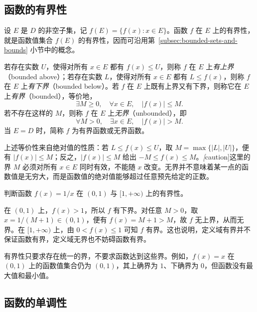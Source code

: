 \documentclass[UTF8,12pt,a4paper,fontset=fandol]{ctexbook}
\begin{document}
\subsection{函数的有界性}
\label{subsec:boundedness-of-functions}

设 $E$ 是 $D$ 的非空子集，记 $f(E)=\{f(x):x\in E\}$。函数 $f$ 在 $E$ 上的有界性，就是函数值集合 $f(E)$ 的有界性，因而可沿用第~\ref{subsec:bounded-sets-and-bounds} 小节中的概念。

\begin{definition}
\label{def:bounded-functions}
若存在实数 $U$，使得对所有 $x\in E$ 都有 $f(x)\leq U$，则称 $f$ 在 $E$ 上\emph{有上界}（bounded above）；若存在实数 $L$，使得对所有 $x\in E$ 都有 $L\leq f(x)$，则称 $f$ 在 $E$ 上\emph{有下界}（bounded below）。若 $f$ 在 $E$ 上既有上界又有下界，则称它在 $E$ 上\emph{有界}（bounded），等价地，
\[
    \exists M\geq 0,\quad \forall x\in E,\quad |f(x)|\leq M.
\]
若不存在这样的 $M$，则称 $f$ 在 $E$ 上\emph{无界}（unbounded），即
\[
    \forall M>0,\quad \exists x\in E,\quad |f(x)|>M.
\]
当 $E=D$ 时，简称 $f$ 为有界函数或无界函数。
\end{definition}

上述等价性来自绝对值的性质：若 $L\leq f(x)\leq U$，取 $M=\max\{|L|,|U|\}$，便有 $|f(x)|\leq M$；反之，$|f(x)|\leq M$ 给出 $-M\leq f(x)\leq M$。\emph[caution]{这里的界 $M$ 必须对所有 $x\in E$ 同时有效，不能随 $x$ 改变。}无界并不意味着某一点的函数值是无穷大，而是函数值的绝对值能够超过任意预先给定的正数。

\begin{example}
\label{ex:function-boundedness-domain}
判断函数 $f(x)=1/x$ 在 $(0,1)$ 与 $[1,+\infty)$ 上的有界性。
\end{example}

\begin{solve}
在 $(0,1)$ 上，$f(x)>1$，所以 $f$ 有下界。对任意 $M>0$，取 $x=1/(M+1)\in(0,1)$，便有 $f(x)=M+1>M$，故 $f$ 无上界，从而无界。在 $[1,+\infty)$ 上，由 $0<f(x)\leq 1$ 可知 $f$ 有界。这也说明，定义域有界并不保证函数有界，定义域无界也不妨碍函数有界。
\end{solve}

有界性只要求存在统一的界，不要求函数达到这些界。例如，$f(x)=x$ 在 $(0,1)$ 上的函数值集合仍为 $(0,1)$，其上确界为 $1$、下确界为 $0$，但函数没有最大值和最小值。

\subsection{函数的单调性}
\label{subsec:monotonicity-of-functions}
\end{document}
